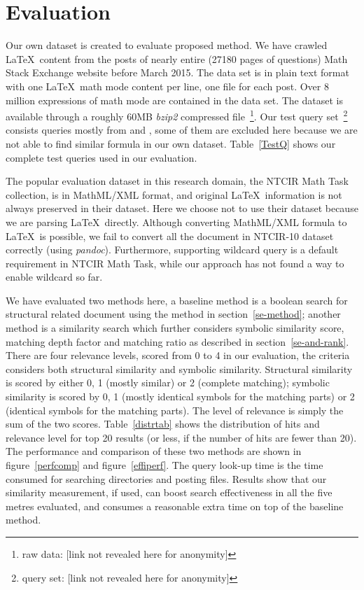 \documentclass{acm_proc_article-sp}
\begin{document}
\section{Evaluation}
Our own dataset is created to evaluate proposed method.
We have crawled \LaTeX\ content from the posts of nearly entire (27180 pages of questions) Math Stack Exchange website before March 2015. 
The data set is in plain text format with one \LaTeX\ math mode content per line, one file for each post. 
Over 8 million expressions of math mode are contained in the data set. 
The dataset is available through a roughly 60MB \textit{bzip2} compressed file~\footnote{raw data: [link not revealed here for anonymity]}.
Our test query set~\footnote{query set: [link not revealed here for anonymity]} consists queries mostly from \cite{ntcirtopic} and \cite{symbolpairs15}, some of them are excluded here because we are not able to find similar formula in our own dataset.
Table~\ref{TestQ} shows our complete test queries used in our evaluation. 

The popular evaluation dataset in this research domain, the NTCIR Math Task collection, is in MathML/XML format, and original \LaTeX\ information is not always preserved in their dataset. 
Here we choose not to use their dataset because we are parsing \LaTeX\ directly.
Although converting MathML/XML formula to \LaTeX\ is possible, we fail to convert all the document in NTCIR-10 dataset correctly (using \textit{pandoc}).
Furthermore, supporting wildcard query is a default requirement in NTCIR Math Task, while our approach has not found a way to enable wildcard so far.

We have evaluated two methods here, a baseline method is a boolean search for structural related document using the method in section~\ref{se-method}; another method is a similarity search which further considers symbolic similarity score, matching depth factor and matching ratio as described in section~\ref{se-and-rank}.
There are four relevance levels, scored from 0 to 4 in our evaluation,
the criteria considers both structural similarity and symbolic similarity. 
Structural similarity is scored by either 0, 1 (mostly similar) or 2 (complete matching);
symbolic similarity is scored by 0, 1 (mostly identical symbols for the matching parts) or 2 (identical symbols for the matching parts).
The level of relevance is simply the sum of the two scores.
Table~\ref{distrtab} shows the distribution of hits and relevance level for top 20 results (or less, if the number of hits are fewer than 20).
The performance and comparison of these two methods are shown in figure~\ref{perfcomp} and figure~\ref{effiperf}. 
The query look-up time is the time consumed for searching directories and posting files.
Results show that our similarity measurement, if used, can boost search effectiveness in all the five metres evaluated, 
and consumes a reasonable extra time on top of the baseline method. 
\end{document}
